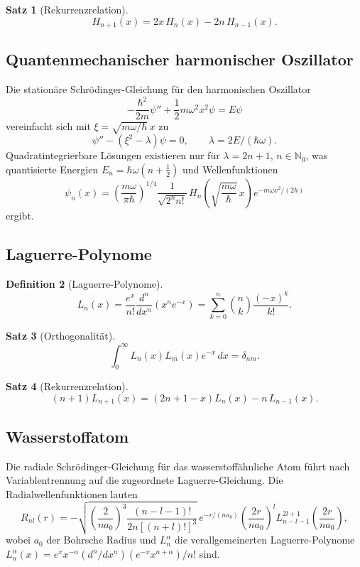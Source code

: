 \documentclass[12pt,a4paper]{amsart}
\newtheorem{theorem}{Satz}[section]
\theoremstyle{definition}
\newtheorem{definition}[theorem]{Definition}
\begin{document}
\begin{theorem}[Rekurrenzrelation]
\[
  H_{n+1}(x) = 2x\,H_n(x) - 2n\,H_{n-1}(x).
\]
\end{theorem}

\subsection{Quantenmechanischer harmonischer Oszillator}

Die stationäre Schrödinger-Gleichung für den harmonischen Oszillator
\[
  -\frac{\hbar^2}{2m}\psi'' + \frac{1}{2}m\omega^2 x^2\psi = E\psi
\]
vereinfacht sich mit \(\xi = \sqrt{m\omega/\hbar}\,x\) zu
\[
  \psi'' - (\xi^2 - \lambda)\psi = 0, \qquad \lambda = 2E/(\hbar\omega).
\]
Quadratintegrierbare Lösungen existieren nur für \(\lambda = 2n+1\), \(n \in \mathbb{N}_0\),
was quantisierte Energien \(E_n = \hbar\omega(n+\tfrac{1}{2})\) und Wellenfunktionen
\[
  \psi_n(x) = \left(\frac{m\omega}{\pi\hbar}\right)^{1/4}
  \frac{1}{\sqrt{2^n n!}}\,H_n\!\left(\sqrt{\frac{m\omega}{\hbar}}\,x\right)
  e^{-m\omega x^2/(2\hbar)}
\]
ergibt.

\subsection{Laguerre-Polynome}

\begin{definition}[Laguerre-Polynome]
\[
  L_n(x) = \frac{e^x}{n!}\frac{d^n}{dx^n}(x^n e^{-x}) = \sum_{k=0}^n \binom{n}{k}
  \frac{(-x)^k}{k!}.
\]
\end{definition}

\begin{theorem}[Orthogonalität]
\[
  \int_0^\infty L_n(x)L_m(x)e^{-x}\,dx = \delta_{nm}.
\]
\end{theorem}

\begin{theorem}[Rekurrenzrelation]
\[
  (n+1)L_{n+1}(x) = (2n+1-x)L_n(x) - n\,L_{n-1}(x).
\]
\end{theorem}

\subsection{Wasserstoffatom}

Die radiale Schrödinger-Gleichung für das wasserstoffähnliche Atom führt nach
Variablentrennung auf die zugeordnete Laguerre-Gleichung.
Die Radialwellenfunktionen lauten
\[
  R_{nl}(r) = -\sqrt{\left(\frac{2}{na_0}\right)^3\frac{(n-l-1)!}{2n[(n+l)!]^3}}\,
  e^{-r/(na_0)}\!\left(\frac{2r}{na_0}\right)^l L_{n-l-1}^{2l+1}\!\!\left(\frac{2r}{na_0}\right),
\]
wobei \(a_0\) der Bohrsche Radius und \(L_n^\alpha\) die verallgemeinerten Laguerre-Polynome
\(L_n^\alpha(x) = e^x x^{-\alpha}(d^n/dx^n)(e^{-x}x^{n+\alpha})/n!\) sind.
\end{document}
